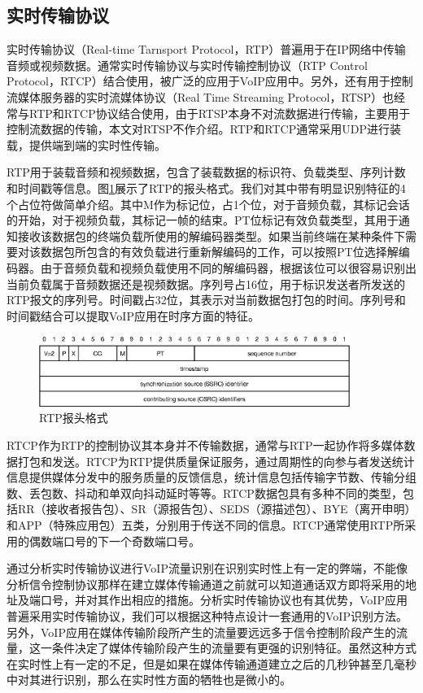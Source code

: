 \subsection{实时传输协议}
实时传输协议（Real-time Tarnsport Protocol，RTP）普遍用于在IP网络中传输音频或视频数据。通常实时传输协议与实时传输控制协议（RTP Control Protocol，RTCP）结合使用，被广泛的应用于VoIP应用中。另外，还有用于控制流媒体服务器的实时流媒体协议（Real Time Streaming Protocol，RTSP）也经常与RTP和RTCP协议结合使用，由于RTSP本身不对流数据进行传输，主要用于控制流数据的传输，本文对RTSP不作介绍。RTP和RTCP通常采用UDP进行装载，提供端到端的实时性传输。

RTP用于装载音频和视频数据，包含了装载数据的标识符、负载类型、序列计数和时间戳等信息。图\ref{fig:rtp}展示了RTP的报头格式。我们对其中带有明显识别特征的4个占位符做简单介绍。其中M作为标记位，占1个位，对于音频负载，其标记会话的开始，对于视频负载，其标记一帧的结束。PT位标记有效负载类型，其用于通知接收该数据包的终端负载所使用的解编码器类型。如果当前终端在某种条件下需要对该数据包所包含的有效负载进行重新解编码的工作，可以按照PT位选择解编码器。由于音频负载和视频负载使用不同的解编码器，根据该位可以很容易识别出当前负载属于音频数据还是视频数据。序列号占16位，用于标识发送者所发送的RTP报文的序列号。时间戳占32位，其表示对当前数据包打包的时间。序列号和时间戳结合可以提取VoIP应用在时序方面的特征。

\begin{figure}[thb]
\begin{center}
\includegraphics[width=0.9\textwidth]{figures/rtp.eps}
\caption{RTP报头格式}\label{fig:rtp}
\end{center}
\end{figure}

RTCP作为RTP的控制协议其本身并不传输数据，通常与RTP一起协作将多媒体数据打包和发送。RTCP为RTP提供质量保证服务，通过周期性的向参与者发送统计信息提供媒体分发中的服务质量的反馈信息，统计信息包括传输字节数、传输分组数、丢包数、抖动和单双向抖动延时等等。RTCP数据包具有多种不同的类型，包括RR（接收者报告包）、SR（源报告包）、SEDS（源描述包）、BYE（离开申明）和APP（特殊应用包）五类，分别用于传送不同的信息。RTCP通常使用RTP所采用的偶数端口号的下一个奇数端口号。

通过分析实时传输协议进行VoIP流量识别在识别实时性上有一定的弊端，不能像分析信令控制协议那样在建立媒体传输通道之前就可以知道通话双方即将采用的地址及端口号，并对其作出相应的措施。分析实时传输协议也有其优势，VoIP应用普遍采用实时传输协议，我们可以根据这种特点设计一套通用的VoIP识别方法。另外，VoIP应用在媒体传输阶段所产生的流量要远远多于信令控制阶段产生的流量，这一条件决定了媒体传输阶段产生的流量要有更强的识别特征。虽然这种方式在实时性上有一定的不足，但是如果在媒体传输通道建立之后的几秒钟甚至几毫秒中对其进行识别，那么在实时性方面的牺牲也是微小的。




